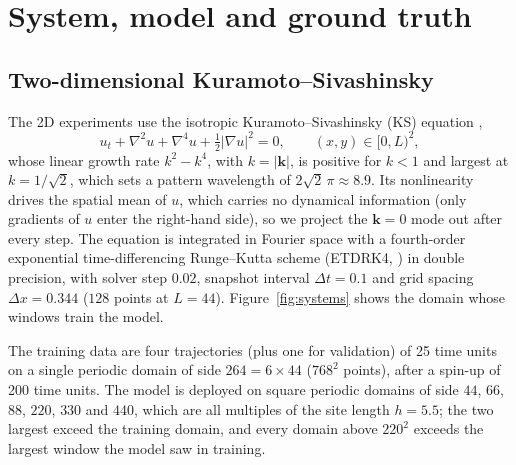 \section{System, model and ground truth}
\label{sec:system}

\subsection{Two-dimensional Kuramoto--Sivashinsky}
\label{sec:ks2d}

The 2D experiments use the isotropic Kuramoto--Sivashinsky (KS) equation
\citep{kuramoto1976,sivashinsky1977,kalogirou2015},
\begin{equation}
  u_t + \nabla^2 u + \nabla^4 u + \tfrac12|\nabla u|^2 = 0,
  \qquad (x,y)\in[0,L)^2,
  \label{eq:ks2d}
\end{equation}
whose linear growth rate $k^2-k^4$, with $k=|\bm k|$, is positive for $k<1$ and
largest at $k=1/\sqrt2$, which sets a pattern wavelength of
$2\sqrt2\,\pi\approx8.9$. Its nonlinearity drives the spatial mean of
$u$, which carries no dynamical information (only gradients of $u$ enter
the right-hand side), so we project the $\bm k=0$ mode out after every
step. The equation is integrated in Fourier space with a fourth-order
exponential time-differencing Runge--Kutta scheme (ETDRK4,
\citealp{kassam2005}) in double precision, with solver step $0.02$,
snapshot interval $\Delta t=0.1$ and grid spacing $\Delta x=0.344$
($128$ points at $L=44$). Figure~\ref{fig:systems} shows the domain whose
windows train the model.

The training data are four trajectories (plus one for validation) of 25
time units on a single periodic domain of side $264=6\times44$ ($768^2$
points), after a spin-up of 200 time units. The model is deployed on
square periodic domains of side $44$, $66$, $88$, $220$, $330$ and $440$, which
are all multiples of the site length $h=5.5$; the two largest exceed the
training domain, and every domain above $220^2$ exceeds the largest window
the model saw in training.

